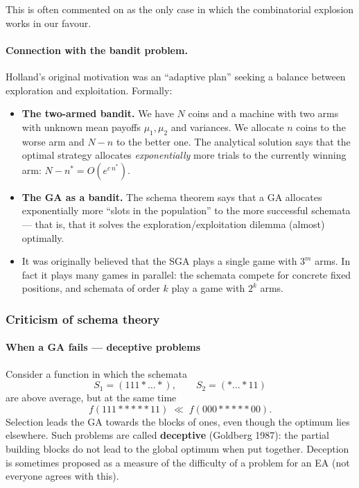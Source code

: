 \documentclass[11pt,a4paper]{article}
\theoremstyle{definition}
\providecommand{\uv}[1]{``#1''}
\begin{document}
This is often commented on as the only case in which the combinatorial explosion
works in our favour.

\paragraph{Connection with the bandit problem.} Holland's original motivation
was an \uv{adaptive plan} seeking a balance between exploration and
exploitation. Formally:
\begin{itemize}
\item \textbf{The two-armed bandit.} We have $N$ coins and a machine with two
  arms with unknown mean payoffs $\mu_1, \mu_2$ and variances. We allocate $n$
  coins to the worse arm and $N-n$ to the better one. The analytical solution
  says that the optimal strategy allocates \emph{exponentially} more trials to
  the currently winning arm: $N - n^* = O(e^{c\, n^*})$.
\item \textbf{The GA as a bandit.} The schema theorem says that a GA allocates
  exponentially more \uv{slots in the population} to the more successful
  schemata --- that is, that it solves the exploration/exploitation dilemma
  (almost) optimally.
\item It was originally believed that the SGA plays a single game with $3^m$
  arms. In fact it plays many games in parallel: the schemata compete for
  concrete fixed positions, and schemata of order $k$ play a game with $2^k$
  arms.
\end{itemize}

\subsubsection{Criticism of schema theory}

\paragraph{When a GA fails --- deceptive problems}

Consider a function in which the schemata
\[
S_1 = (111{*}\ldots{*}), \qquad S_2 = ({*}\ldots{*}11)
\]
are above average, but at the same time
\[
f(111{*}{*}{*}{*}{*}11) \;\ll\; f(000{*}{*}{*}{*}{*}00).
\]
Selection leads the GA towards the blocks of ones, even though the optimum lies
elsewhere. Such problems are called \textbf{deceptive} (Goldberg 1987): the
partial building blocks do not lead to the global optimum when put together.
Deception is sometimes proposed as a measure of the difficulty of a problem for
an EA (not everyone agrees with this).
\end{document}
